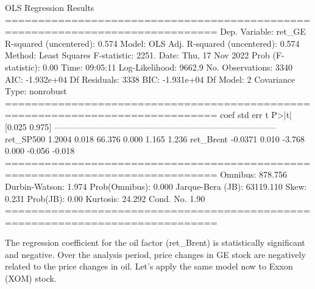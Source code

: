 \begin{ioutput}
OLS Regression Results                                
==============================================================================
Dep. Variable:                 ret_GE   R-squared (uncentered):          0.574
Model:                            OLS   Adj. R-squared (uncentered):     0.574
Method:                 Least Squares   F-statistic:                     2251.
Date:                Thu, 17 Nov 2022   Prob (F-statistic):               0.00
Time:                        09:05:11   Log-Likelihood:                 9662.9
No. Observations:                3340   AIC:                        -1.932e+04
Df Residuals:                    3338   BIC:                        -1.931e+04
Df Model:                           2                                                  
Covariance Type:            nonrobust                                                  
==============================================================================
coef    std err          t      P>|t|      [0.025      0.975]
------------------------------------------------------------------------------
ret_SP500      1.2004      0.018     66.376      0.000       1.165       1.236
ret_Brent     -0.0371      0.010     -3.768      0.000      -0.056      -0.018
==============================================================================
Omnibus:                      878.756   Durbin-Watson:                   1.974
Prob(Omnibus):                  0.000   Jarque-Bera (JB):            63119.110
Skew:                           0.231   Prob(JB):                         0.00
Kurtosis:                      24.292   Cond. No.                         1.90
==============================================================================
\end{ioutput}

The regression coefficient for the oil factor (ret\_Brent) is statistically significant and negative. Over the analysis period, price changes in GE stock are negatively related to the price changes in oil.
Let's apply the same model now to Exxon (XOM) stock.

